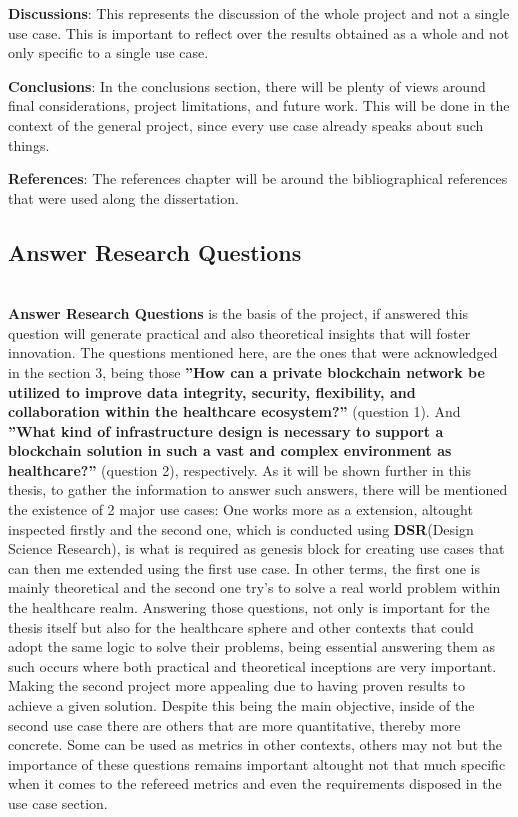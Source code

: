 \textbf{Discussions}: This represents the discussion of the whole project and not a single use case. This is important to reflect over the results obtained as a whole and not only specific to a single use case.

\textbf {Conclusions}: In the conclusions section, there will be plenty of views around final considerations, project limitations, and future work. This will be done in the context of the general project, since every use case already speaks about such things.

\textbf{References}: The references chapter will be around the bibliographical references that were used along the dissertation.

\subsection{Answer Research Questions}\mbox{}\\
\textbf{Answer Research Questions} is the basis of the project, if answered this question will generate practical and also theoretical insights that will foster innovation. The questions mentioned here, are the ones that were acknowledged in the section 3, being those \textbf{”How can a private blockchain network be utilized to improve data integrity, security,
flexibility, and collaboration within the healthcare ecosystem?”} (question 1). And \textbf{”What kind of infrastructure design is necessary to support a blockchain solution in such a
vast and complex environment as healthcare?”} (question 2), respectively. As it will be shown further in this thesis, to gather the information to answer such answers, there will be mentioned the existence of 2 major use cases: One works more as a extension, altought inspected firstly and the second one, which is conducted using \textbf{DSR}(Design Science Research), is what is required as genesis block for creating use cases that can then me extended using the first use case. In other terms, the first one is mainly theoretical  and the second one try's to solve a real world problem within the healthcare realm. Answering those questions, not only is important for the thesis itself but also for the healthcare sphere and other contexts that could adopt the same logic to solve their problems, being essential answering them as such occurs where both practical and theoretical inceptions are very important. Making the second project more appealing due to having proven results to achieve a given solution.
Despite this being the main objective, inside of the second use case there are others that are more quantitative, thereby more concrete. Some can be used as metrics in other contexts, others may not but the importance of these questions remains important altought not that much specific when it comes to the refereed metrics and even the requirements disposed in the use case section.

